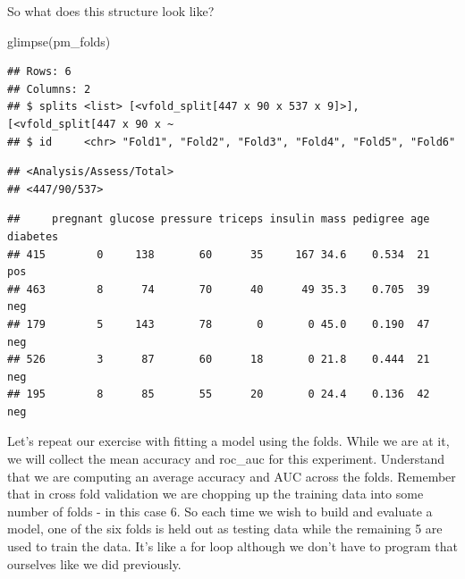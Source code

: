\documentclass[
]{article}
\newenvironment{Shaded}{\begin{snugshade}}{\end{snugshade}}
\newcommand{\DecValTok}[1]{\textcolor[rgb]{0.00,0.00,0.81}{#1}}
\newcommand{\FunctionTok}[1]{\textcolor[rgb]{0.00,0.00,0.00}{#1}}
\newcommand{\NormalTok}[1]{#1}
\newcommand{\SpecialCharTok}[1]{\textcolor[rgb]{0.00,0.00,0.00}{#1}}
\newcommand{\StringTok}[1]{\textcolor[rgb]{0.31,0.60,0.02}{#1}}
\begin{document}
So what does this structure look like?

\begin{Shaded}
\begin{Highlighting}[]
\FunctionTok{glimpse}\NormalTok{(pm\_folds)}
\end{Highlighting}
\end{Shaded}

\begin{verbatim}
## Rows: 6
## Columns: 2
## $ splits <list> [<vfold_split[447 x 90 x 537 x 9]>], [<vfold_split[447 x 90 x ~
## $ id     <chr> "Fold1", "Fold2", "Fold3", "Fold4", "Fold5", "Fold6"
\end{verbatim}

\begin{Shaded}
\end{Shaded}

\begin{verbatim}
## <Analysis/Assess/Total>
## <447/90/537>
\end{verbatim}

\begin{Shaded}
\end{Shaded}

\begin{verbatim}
##     pregnant glucose pressure triceps insulin mass pedigree age diabetes
## 415        0     138       60      35     167 34.6    0.534  21      pos
## 463        8      74       70      40      49 35.3    0.705  39      neg
## 179        5     143       78       0       0 45.0    0.190  47      neg
## 526        3      87       60      18       0 21.8    0.444  21      neg
## 195        8      85       55      20       0 24.4    0.136  42      neg
\end{verbatim}

Let's repeat our exercise with fitting a model using the folds. While we
are at it, we will collect the mean accuracy and roc\_auc for this
experiment. Understand that we are computing an average accuracy and AUC
across the folds. Remember that in cross fold validation we are chopping
up the training data into some number of folds - in this case 6. So each
time we wish to build and evaluate a model, one of the six folds is held
out as testing data while the remaining 5 are used to train the data.
It's like a for loop although we don't have to program that ourselves
like we did previously.
\end{document}
